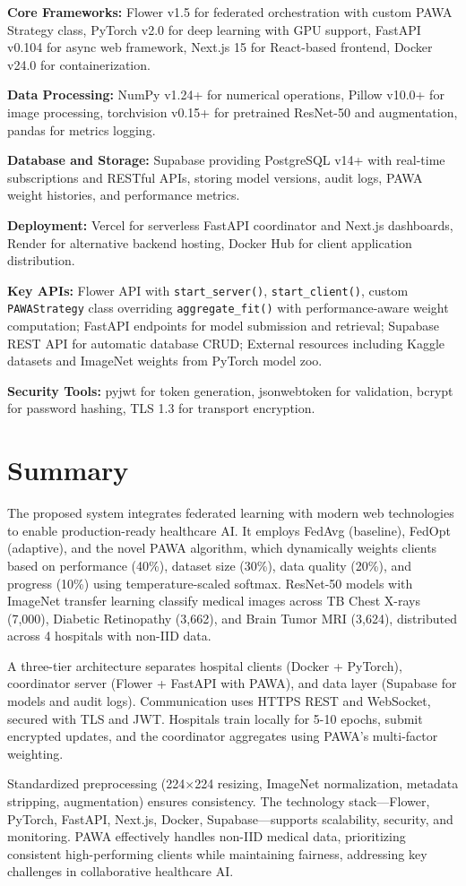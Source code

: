 \textbf{Core Frameworks:} Flower v1.5 for federated orchestration with custom PAWA Strategy class, PyTorch v2.0 for deep learning with GPU support, FastAPI v0.104 for async web framework, Next.js 15 for React-based frontend, Docker v24.0 for containerization.

\textbf{Data Processing:} NumPy v1.24+ for numerical operations, Pillow v10.0+ for image processing, torchvision v0.15+ for pretrained ResNet-50 and augmentation, pandas for metrics logging.

\textbf{Database and Storage:} Supabase providing PostgreSQL v14+ with real-time subscriptions and RESTful APIs, storing model versions, audit logs, PAWA weight histories, and performance metrics.

\textbf{Deployment:} Vercel for serverless FastAPI coordinator and Next.js dashboards, Render for alternative backend hosting, Docker Hub for client application distribution.

\textbf{Key APIs:} Flower API with \texttt{start\_server()}, \texttt{start\_client()}, custom \texttt{PAWAStrategy} class overriding \texttt{aggregate\_fit()} with performance-aware weight computation; FastAPI endpoints for model submission and retrieval; Supabase REST API for automatic database CRUD; External resources including Kaggle datasets and ImageNet weights from PyTorch model zoo.

\textbf{Security Tools:} pyjwt for token generation, jsonwebtoken for validation, bcrypt for password hashing, TLS 1.3 for transport encryption.

\section{Summary}

The proposed system integrates federated learning with modern web technologies to enable production-ready healthcare AI. It employs FedAvg (baseline), FedOpt (adaptive), and the novel PAWA algorithm, which dynamically weights clients based on performance (40\%), dataset size (30\%), data quality (20\%), and progress (10\%) using temperature-scaled softmax. ResNet-50 models with ImageNet transfer learning classify medical images across TB Chest X-rays (7,000), Diabetic Retinopathy (3,662), and Brain Tumor MRI (3,624), distributed across 4 hospitals with non-IID data.

A three-tier architecture separates hospital clients (Docker + PyTorch), coordinator server (Flower + FastAPI with PAWA), and data layer (Supabase for models and audit logs). Communication uses HTTPS REST and WebSocket, secured with TLS and JWT. Hospitals train locally for 5-10 epochs, submit encrypted updates, and the coordinator aggregates using PAWA’s multi-factor weighting.

Standardized preprocessing (224$\times$224 resizing, ImageNet normalization, metadata stripping, augmentation) ensures consistency. The technology stack—Flower, PyTorch, FastAPI, Next.js, Docker, Supabase—supports scalability, security, and monitoring. PAWA effectively handles non-IID medical data, prioritizing consistent high-performing clients while maintaining fairness, addressing key challenges in collaborative healthcare AI.
